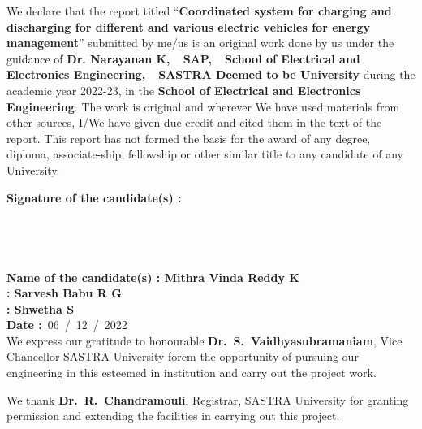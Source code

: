 \documentclass[a4paper, 12pt, oneside]{sastra}
\begin{document}
		\begin{doublespace}
		\linespread{2}
		
		We declare that the report titled ``\textbf{Coordinated system for charging and discharging for different and various electric vehicles for energy management}'' submitted by me/us is an original work done by us under the guidance of \textbf{Dr. Narayanan K,~~SAP,~~School of Electrical and Electronics Engineering,~~SASTRA Deemed to be University} during the academic year 2022-23, in the \textbf{School of Electrical and Electronics Engineering}. The work is original and wherever We have used materials from other sources, I/We have given due credit and cited them in the text of the report. This report has not formed the basis for the award of any degree, diploma, associate-ship, fellowship or other similar title to any candidate of any University.\\
		
	\end{doublespace}
	\noindent \textbf{Signature of the candidate(s)	:}	
	\\
	\\
	\\
	\\
	\\
	\noindent\textbf{Name of the candidate(s)\hspace{7mm}		: Mithra Vinda Reddy K}\\
	\hspace*{53mm}\textbf{: Sarvesh Babu R G}\\
	\hspace*{53mm}\textbf{: Shwetha S}\\
	\noindent\textbf{Date\hspace*{43.5mm}					:}~06~/~12~/~2022\\%
	
	\acknowledgements
	\onehalfspacing
	\hspace*{12pt} We express our gratitude to honourable \textbf{Dr.~S.~Vaidhyasubramaniam}, Vice Chancellor SASTRA University forcm the opportunity of pursuing our engineering in this esteemed in institution and carry out the project work.
	
	\par We thank \textbf{Dr.~R.~Chandramouli}, Registrar, SASTRA University for granting permission and extending the facilities in carrying out this project.
	
\end{document}

